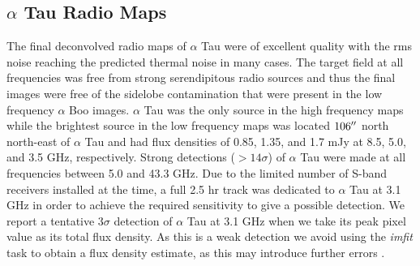 \documentclass[iop]{emulateapj}
\begin{document}
\subsection{$\alpha$ Tau Radio Maps} \label{results2}
The final deconvolved radio maps of $\alpha$ Tau were of excellent quality with the rms noise reaching the predicted thermal noise in many cases. The target field at all frequencies was free from strong serendipitous radio sources and thus the final images were free of the sidelobe contamination that were present in the low frequency $\alpha$ Boo images. $\alpha$ Tau was the only source in the high frequency maps while the brightest source in the low frequency maps was located $106\mbox{$^{\prime\prime}$}$ north north-east of $\alpha$ Tau and had flux densities of 0.85, 1.35, and 1.7 mJy at 8.5, 5.0, and 3.5 GHz, respectively. Strong detections ($>14\sigma$) of $\alpha$ Tau were made at all frequencies between 5.0 and 43.3 GHz. Due to the limited number of S-band receivers installed at the time, a full 2.5 hr track was dedicated to $\alpha$ Tau at 3.1 GHz in order to achieve the required sensitivity to give a possible detection. We report a tentative $3\sigma$ detection of $\alpha$ Tau at 3.1 GHz when we take its peak pixel value as its total flux density. As this is a weak detection we avoid using the \textit{imfit} task to obtain a flux density estimate, as this may introduce further errors \citep{1999ASPC..180.....T}.
\end{document}
